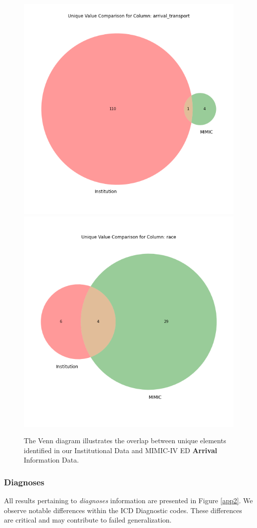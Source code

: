 \documentclass{article}
\theoremstyle{plain}
\theoremstyle{definition}
\theoremstyle{remark}
\begin{document}
\begin{figure}[h!]
   \centering 
   \includegraphics[width=4.5in]{plots/arrival_transport_venn.png} 
   \includegraphics[width=4.5in]{plots/race_venn.png} 
   \caption{The Venn diagram illustrates the overlap between unique elements identified in our Institutional Data and MIMIC-IV ED \textbf{Arrival} Information Data.}
   \label{app1} 
 \end{figure} 

 \subsubsection*{Diagnoses}
All results pertaining to \textit{diagnoses }information are presented in Figure \ref{app2}. We observe notable differences within the ICD Diagnostic codes. These differences are critical and may contribute to failed generalization.
 
\end{document}
